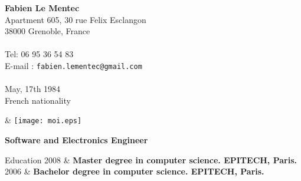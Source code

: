\documentclass{resume}
\newcommand{\activite}[1]{\textbf{#1}\ }
\begin{document}
\begin{chapeau}
  \begin{adresse}
    \textbf{Fabien Le Mentec}\\
    Apartment 605, 30 rue Felix Esclangon \\
    38000 Grenoble, France	\\
    \ligne\\
    Tel: 06 95 36 54 83\\
    E-mail : \texttt{fabien.lementec@gmail.com}\\
    \ligne\\
    May, 17th 1984 \\
    French nationality \\
  \end{adresse}
  \begin{etatcivil}
    & \texttt{[image: moi.eps]}\\[2mm]
  \end{etatcivil}
\end{chapeau}

\vspace{0.4cm}

\begin{center}
  \textbf{\huge{Software and Electronics Engineer}}
\end{center}

\vspace{0.6cm}

\begin{rubriquetableau}[2cm]{Education}
  2008
  & \activite{\small{Master degree in computer science. EPITECH, Paris.}}
  \\[0.5mm]

  2006
  & \activite{\small{Bachelor degree in computer science. EPITECH, Paris.}}
  \\[0.5mm]

\end{rubriquetableau}

\vspace{0.6cm}
\end{document}
